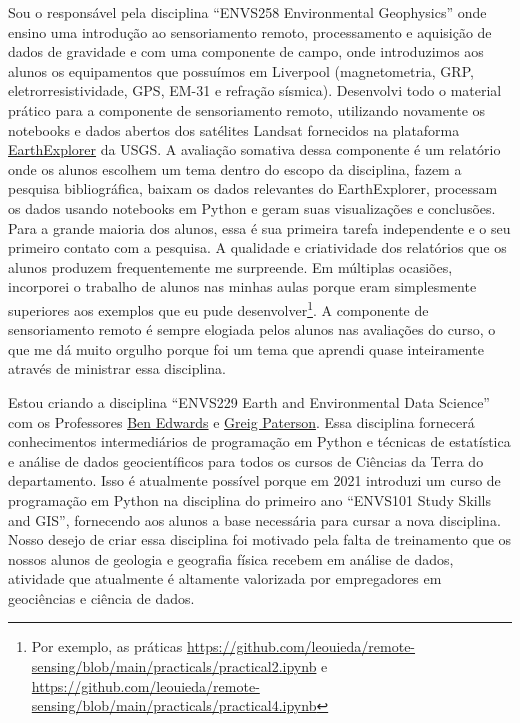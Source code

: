 \documentclass[12pt,a4paper,oneside]{book}
\begin{document}
Sou o responsável pela disciplina ``ENVS258 Environmental Geophysics'' onde
ensino uma introdução ao sensoriamento remoto, processamento e aquisição de
dados de gravidade e com uma componente de campo, onde introduzimos aos alunos
os equipamentos que possuímos em Liverpool (magnetometria, GRP,
eletrorresistividade, GPS, EM-31 e refração sísmica).
Desenvolvi todo o material prático para a componente de sensoriamento remoto,
utilizando novamente os notebooks e dados abertos dos satélites Landsat
fornecidos na plataforma \href{https://earthexplorer.usgs.gov/}{EarthExplorer}
da USGS.
A avaliação somativa dessa componente é um relatório onde os alunos escolhem um
tema dentro do escopo da disciplina, fazem a pesquisa bibliográfica, baixam os
dados relevantes do EarthExplorer, processam os dados usando notebooks em
Python e geram suas visualizações e conclusões.
Para a grande maioria dos alunos, essa é sua primeira tarefa independente e o
seu primeiro contato com a pesquisa.
A qualidade e criatividade dos relatórios que os alunos produzem frequentemente
me surpreende.
Em múltiplas ocasiões, incorporei o trabalho de alunos nas minhas aulas porque
eram simplesmente superiores aos exemplos que eu pude desenvolver\footnote{Por
exemplo, as práticas
\url{https://github.com/leouieda/remote-sensing/blob/main/practicals/practical2.ipynb}
e
\url{https://github.com/leouieda/remote-sensing/blob/main/practicals/practical4.ipynb}}.
A componente de sensoriamento remoto é sempre elogiada pelos alunos nas
avaliações do curso, o que me dá muito orgulho porque foi um tema que aprendi
quase inteiramente através de ministrar essa disciplina.

Estou criando a disciplina ``ENVS229 Earth and Environmental Data Science'' com
os Professores \href{https://www.liverpool.ac.uk/environmental-sciences/staff/ben-edwards/}{Ben Edwards}
e \href{https://www.liverpool.ac.uk/environmental-sciences/staff/greig-paterson/}{Greig Paterson}.
Essa disciplina fornecerá conhecimentos intermediários de programação em Python
e técnicas de estatística e análise de dados geocientíficos para todos os
cursos de Ciências da Terra do departamento.
Isso é atualmente possível porque em 2021 introduzi um curso de programação em
Python na disciplina do primeiro ano ``ENVS101 Study Skills and GIS'',
fornecendo aos alunos a base necessária para cursar a nova disciplina.
Nosso desejo de criar essa disciplina foi motivado pela falta de treinamento
que os nossos alunos de geologia e geografia física recebem em análise de
dados, atividade que atualmente é altamente valorizada por empregadores em
geociências e ciência de dados.
\end{document}
